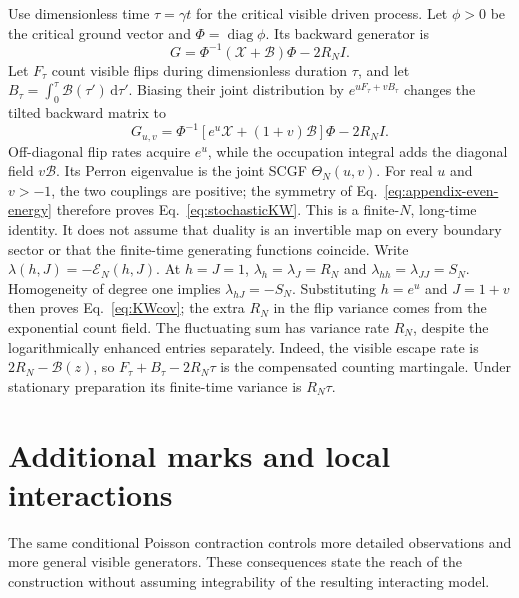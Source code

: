 \documentclass[aps,pre,reprint,amsmath,amssymb,longbibliography,floatfix]{revtex4-2}
\newcommand{\dd}{\,\mathrm d}
\begin{document}
Use dimensionless time $\tau=\gamma t$ for the critical visible driven
process. Let $\phi>0$ be the critical ground vector and
$\Phi=\operatorname{diag}\phi$. Its backward generator is
\begin{equation}
 G=\Phi^{-1}(\mathcal X+\mathcal B)\Phi-2R_NI.
 \label{eq:appendix-critical-doob}
\end{equation}
Let $F_\tau$ count visible flips during dimensionless duration
$\tau$, and let
$B_\tau=\int_0^\tau\mathcal B(\tau')\dd\tau'$.
Biasing their joint distribution by $e^{uF_\tau+vB_\tau}$
changes the tilted backward matrix to
\begin{equation}
 G_{u,v}=\Phi^{-1}\left[e^u\mathcal X+(1+v)\mathcal B\right]\Phi-2R_NI.
 \label{eq:appendix-joint-tilt}
\end{equation}
Off-diagonal flip rates acquire $e^u$, while the occupation integral
adds the diagonal field $v\mathcal B$. Its Perron eigenvalue is the
joint SCGF $\Theta_N(u,v)$. For real $u$ and $v>-1$, the two couplings
are positive; the symmetry of Eq.~\eqref{eq:appendix-even-energy} therefore
proves Eq.~\eqref{eq:stochasticKW}.
This is a finite-$N$, long-time identity. It does not assume that duality
is an invertible map on every boundary sector or that the finite-time
generating functions coincide. Write $\lambda(h,J)=-\mathcal E_N(h,J)$. At $h=J=1$,
$\lambda_h=\lambda_J=R_N$ and
$\lambda_{hh}=\lambda_{JJ}=S_N$. Homogeneity of degree one implies
$\lambda_{hJ}=-S_N$. Substituting $h=e^u$ and $J=1+v$ then proves
Eq.~\eqref{eq:KWcov}; the extra $R_N$ in the flip variance comes from
the exponential count field.
The fluctuating sum has variance rate $R_N$, despite the logarithmically
enhanced entries separately. Indeed, the visible escape rate is
$2R_N-\mathcal B(z)$, so
$F_\tau+B_\tau-2R_N\tau$ is the compensated
counting martingale. Under stationary preparation its finite-time
variance is $R_N\tau$.

\section{Additional marks and local interactions}
\label{app:extensions}
The same conditional Poisson contraction controls more detailed
observations and more general visible generators. These consequences
state the reach of the construction without assuming integrability of
the resulting interacting model.
\end{document}

